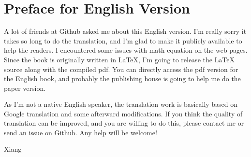 \chapter*{Preface for English Version}
A lot of friends at Github asked me about this English version. I'm really sorry it takes so long to do the translation, and I'm glad to make it publicly available to help the readers. I encountered some issues with math equation on the web pages. Since the book is originally written in LaTeX, I'm going to release the LaTeX source along with the compiled pdf. You can directly access the pdf version for the English book, and probably the publishing house is going to help me do the paper version.

As I'm not a native English speaker, the translation work is basically based on Google translation and some afterward modifications. If you think the quality of translation can be improved, and you are willing to do this, please contact me or send an issue on Github. Any help will be welcome!

Xiang